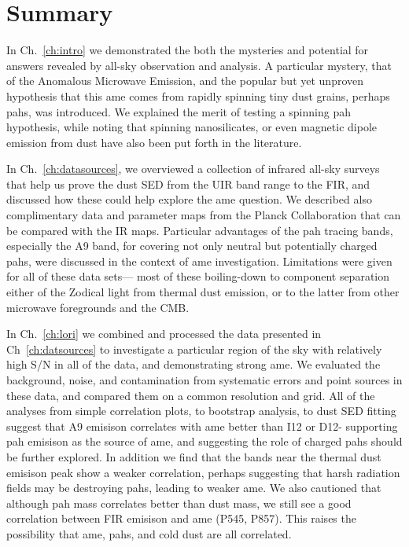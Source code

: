 \chapter{Summary}
  \label{ch:Summary}

  In Ch.~\ref{ch:intro} we demonstrated the both the mysteries and potential for answers revealed by all-sky observation and analysis. A particular mystery, that of the Anomalous Microwave Emission, and the popular but yet unproven hypothesis that this \acrshort{ame} comes from rapidly spinning tiny dust grains, perhaps \acrshort{pah}s, was introduced. We explained the merit of testing a spinning \acrshort{pah} hypothesis, while noting that spinning nanosilicates, or even magnetic dipole emission from dust have also been put forth in the literature.

  In Ch.~\ref{ch:datasources}, we overviewed a collection of infrared all-sky surveys that help us prove the dust SED from the UIR band range to the FIR, and discussed how these could help explore the \acrshort{ame} question. We described also complimentary data and parameter maps from the Planck Collaboration that can be compared with the IR maps. Particular advantages of the \acrshort{pah} tracing bands, especially the A9 band, for covering not only neutral but potentially charged \acrshort{pah}s, were discussed in the context of \acrshort{ame} investigation. Limitations were given for all of these data sets--- most of these boiling-down to component separation either of the Zodical light from thermal dust emission, or to the latter from other microwave foregrounds and the CMB.

  In Ch.~\ref{ch:lori} we combined and processed the data presented in Ch~\ref{ch:datsources} to investigate a particular region of the sky with relatively high S/N in all of the data, and demonstrating strong \acrshort{ame}. We evaluated the background, noise, and contamination from systematic errors and point sources in these data, and compared them on a common resolution and grid. All of the analyses from simple correlation plots, to bootstrap analysis, to dust SED fitting suggest that A9 emisison correlates with \acrshort{ame} better than I12 or D12- supporting \acrshort{pah} emisison as the source of \acrshort{ame}, and suggesting the role of charged \acrshort{pah}s should be further explored. In addition we find that the bands near the thermal dust emisison peak show a weaker correlation, perhaps suggesting that harsh radiation fields may be destroying \acrshort{pah}s, leading to weaker \acrshort{ame}. We also cautioned that although \acrshort{pah} mass correlates better than dust mass, we still see a good correlation between FIR emisison and \acrshort{ame} (P545, P857). This raises the possibility that \acrshort{ame}, \acrshort{pah}s, and cold dust are all correlated.

